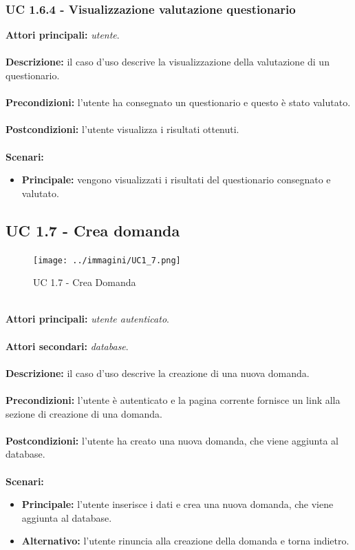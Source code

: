 \documentclass[a4paper,11pt]{article}
\begin{document}
\subsubsection{UC 1.6.4 - Visualizzazione valutazione questionario}

\textbf{Attori principali:} \textit{utente}.\\
\\
\textbf{Descrizione:} il caso d'uso descrive la visualizzazione della valutazione di un questionario. \\
\\
\textbf{Precondizioni:} l'utente ha consegnato un questionario e questo è stato valutato.\\
\\
\textbf{Postcondizioni:} l'utente visualizza i risultati ottenuti. \\
\\
\textbf{Scenari:}
\begin{itemize}
\item \textbf{Principale:} vengono visualizzati i risultati del questionario consegnato e valutato.
\end{itemize}

\newpage

\subsection{UC 1.7 - Crea domanda}

\begin{figure}[h!]
\centering
\texttt{[image: ../immagini/UC1\_7.png]}
\caption{UC 1.7 - Crea Domanda}
\end{figure}
\ \\
\textbf{Attori principali:} \textit{utente autenticato}.\\
\\
\textbf{Attori secondari:} \textit{database}.\\
\\
\textbf{Descrizione:} il caso d'uso descrive la creazione di una nuova domanda. \\
\\
\textbf{Precondizioni:} l'utente è autenticato e la pagina corrente fornisce un link alla sezione di creazione di una domanda.\\
\\
\textbf{Postcondizioni:} l'utente ha creato una nuova domanda, che viene aggiunta al database. \\
\\
\textbf{Scenari:}
\begin{itemize}
\item \textbf{Principale:} l'utente inserisce i dati e crea una nuova domanda, che viene aggiunta al database.
\item \textbf{Alternativo:} l'utente rinuncia alla creazione della domanda e torna indietro.\\ 
\end{itemize}
\vspace{6 mm}
\end{document}
